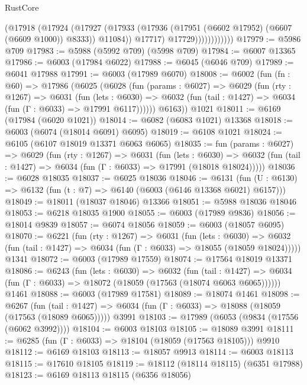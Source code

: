 \begin{lexlean}{RustCore}
\begin{coremodule}
                          (@17918
                            (@17924
                              (@17927
                                (@17933
                                  (@17936 (@17951 (@6602 @17952) (@6607 (@6609 @1000)) @8333))
                                  @11084))
                              @17717)
                            @17729))))))))))))
@17979 := @5986 @709
@17983 := @5988 (@5992 @709) (@5998 @709)
@17984 := @6007 @13365
@17986 := @6003 (@17984 @6022)
@17988 := @6045 (@6046 @709)
@17989 := @6041 @17988
@17991 := @6003 (@17989 @6070)
@18008 := @6002
    (fun (fn : @60) =>
    @17986
      (@6025
        (@6028
          (fun (params : @6027) =>
          @6029
            (fun (rty : @1267) =>
            @6031
              (fun (lets : @6030) =>
              @6032 (fun (tail : @1427) => @6034 (fun (Γ : @6033) => @17991 @6117))))))
        @6163))
    @1021
@18011 := @6169 (@17984 (@6020 @1021))
@18014 := @6082 (@6083 @1021) @13368
@18018 := @6003 (@6074 (@18014 @6091) @6095)
@18019 := @6108 @1021
@18024 := @6105 (@6107 @18019 @13371 @6063 @6065)
@18035 := fun (params : @6027) =>
  @6029
    (fun (rty : @1267) =>
    @6031
      (fun (lets : @6030) =>
      @6032 (fun (tail : @1427) => @6034 (fun (Γ : @6033) => @17991 (@18018 @18024)))))
@18036 := @6028 @18035
@18037 := @6025 @18036
@18046 := @6131
    (fun (U : @6130) => @6132 (fun (t : @7) => @6140 (@6003 (@6146 @13368 @6021) @6157)))
@18049 := @18011 (@18037 @18046) @13366
@18051 := @5988 @18036 @18046
@18053 := @6218 @18035 @1900
@18055 := @6003 (@17989 @9836)
@18056 := @18014 @9839
@18057 := @6074 @18056
@18059 := @6003 (@18057 @6095)
@18070 := @6221
    (fun (rty : @1267) =>
    @6031
      (fun (lets : @6030) =>
      @6032 (fun (tail : @1427) => @6034 (fun (Γ : @6033) => @18055 (@18059 @18024)))))
    @1341
@18072 := @6003 (@17989 @17559)
@18074 := @17564 @18019 @13371
@18086 := @6243
    (fun (lets : @6030) =>
    @6032
      (fun (tail : @1427) =>
      @6034 (fun (Γ : @6033) => @18072 (@18059 (@17563 (@18074 @6063 @6065))))))
    @1461
@18088 := @6003 (@17989 @17581)
@18089 := @18074 @1461
@18098 := @6267
    (fun (tail : @1427) => @6034 (fun (Γ : @6033) => @18088 (@18059 (@17563 (@18089 @6065)))))
    @3991
@18103 := @17989 (@6053 (@9834 (@17556 (@6062 @3992))))
@18104 := @6003 @18103
@18105 := @18089 @3991
@18111 := @6285 (fun (Γ : @6033) => @18104 (@18059 (@17563 @18105))) @9910
@18112 := @6169 @18103
@18113 := @18057 @9913
@18114 := @6003 @18113
@18115 := @17610 @18105
@18119 := @18112 (@18114 @18115) (@6351 @17988)
@18123 := @6169 @18113 @18115 (@6356 @18056)

\end{coremodule}
\end{lexlean}
